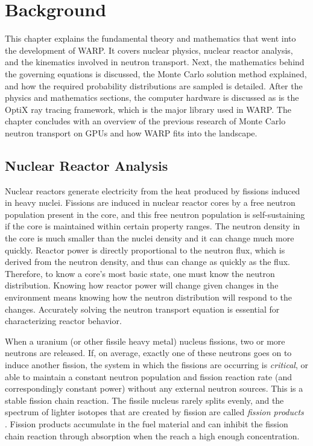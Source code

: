 \chapter{Background}
\label{chap:background}

This chapter explains the fundamental theory and mathematics that went into the development of WARP.  It covers nuclear physics, nuclear reactor analysis, and the kinematics involved in neutron transport.  Next, the mathematics behind the governing equations is discussed, the Monte Carlo solution method explained, and how the required probability distributions are sampled is detailed.  After the physics and mathematics sections, the computer hardware is discussed as is the OptiX ray tracing framework, which is the major library used in WARP.  The chapter concludes with an overview of the previous research of Monte Carlo neutron transport on GPUs and how WARP fits into the landscape.

\section{Nuclear Reactor Analysis}
\label{sec:analysis}

Nuclear reactors generate electricity from the heat produced by fissions induced in heavy nuclei.  Fissions are induced in nuclear reactor cores by a free neutron population present in the core, and this free neutron population is self-sustaining if the core is maintained within certain property ranges.  The neutron density in the core is much smaller than the nuclei density and it can change much more quickly.  Reactor power is directly proportional to the neutron flux, which is derived from the neutron density, and thus can change as quickly as the flux.  Therefore, to know a core's most basic state, one must know the neutron distribution.  Knowing how reactor power will change given changes in the environment means knowing how the neutron distribution will respond to the changes.  Accurately solving the neutron transport equation is essential for characterizing reactor behavior. 

When a uranium (or other fissile heavy metal) nucleus fissions, two or more neutrons are released.  If, on average, exactly one of these neutrons goes on to induce another fission, the system in which the fissions are occurring is \emph{critical}, or able to maintain a constant neutron population and fission reaction rate (and correspondingly constant power) without any external neutron sources.  This is a stable fission chain reaction.  The fissile nucleus rarely splits evenly, and the spectrum of lighter isotopes that are created by fission are called \emph{fission products} \cite{duderstadt}.  Fission products accumulate in the fuel material and can inhibit the fission chain reaction through absorption when the reach a high enough concentration.

